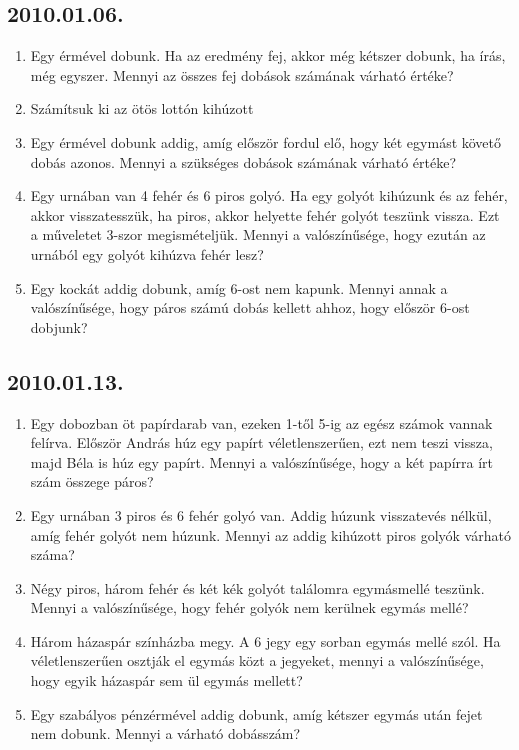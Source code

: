 \subsection*{2010.01.06.}
\begin{enumerate}
\item Egy érmével dobunk. Ha az eredmény fej, akkor még kétszer dobunk, ha írás, még egyszer. Mennyi az összes fej dobások számának várható értéke?
\item Számítsuk ki az ötös lottón kihúzott
\item Egy érmével dobunk addig, amíg először fordul elő, hogy két egymást követő dobás azonos. Mennyi a szükséges dobások számának várható értéke?
\item Egy urnában van 4 fehér és 6 piros golyó. Ha egy golyót kihúzunk és az fehér, akkor visszatesszük, ha piros, akkor helyette fehér golyót teszünk vissza. Ezt a műveletet 3-szor megismételjük. Mennyi a valószínűsége, hogy ezután az urnából egy golyót kihúzva fehér lesz?
\item Egy kockát addig dobunk, amíg 6-ost nem kapunk. Mennyi annak a valószínűsége, hogy páros számú dobás kellett ahhoz, hogy először 6-ost dobjunk?
\end{enumerate}

\subsection*{2010.01.13.}
\begin{enumerate}
\item Egy dobozban öt papírdarab van, ezeken 1-től 5-ig az egész számok vannak felírva. Először András húz egy papírt véletlenszerűen, ezt nem teszi vissza, majd Béla is húz egy papírt. Mennyi a valószínűsége, hogy a két papírra írt szám összege páros?
\item Egy urnában 3 piros és 6 fehér golyó van. Addig húzunk visszatevés nélkül, amíg fehér golyót nem húzunk. Mennyi az addig kihúzott piros golyók várható száma?
\item Négy piros, három fehér és két kék golyót találomra egymásmellé teszünk. Mennyi a valószínűsége, hogy fehér golyók nem kerülnek egymás mellé?
\item Három házaspár színházba megy. A 6 jegy egy sorban egymás mellé szól. Ha véletlenszerűen osztják el egymás közt a jegyeket, mennyi a valószínűsége, hogy egyik házaspár sem ül egymás mellett?
\item Egy szabályos pénzérmével addig dobunk, amíg kétszer egymás után fejet nem dobunk. Mennyi a várható dobásszám?
\end{enumerate}



